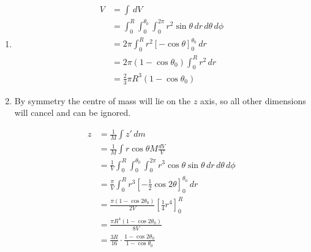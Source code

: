 \documentclass{article}
\begin{document}
\setcounter{subsection}{6}
\subsection{}

\begin{enumerate}
  \item

        \begin{align*}
          V & = \int \,d V                                                                          \\
            & = \int_0^R \int_0^{\theta_0} \int_0^{2 \pi} r^2 \sin \theta \,d r \,d \theta \,d \phi \\
            & = 2 \pi \int_0^R r^2 [-\cos \theta]_0^{\theta_0} \,d r                                \\
            & = 2 \pi (1 - \cos \theta_0) \int_0^R r^2 \,d r                                        \\
            & = \frac{2}{3} \pi R^3 (1 - \cos \theta_0)
        \end{align*}

  \item By symmetry the centre of mass will lie on the $z$ axis, so all other dimensions will cancel and can be ignored.

        \begin{align*}
          z & = \frac{1}{M} \int z' \,d m                                                                                   \\
            & = \frac{1}{M} \int r \cos \theta M \frac{d V}{V}                                                              \\
            & = \frac{1}{V} \int_0^R \int_0^{\theta_0} \int_0^{2 \pi} r^3 \cos \theta \sin \theta \,d r \,d \theta \,d \phi \\
            & = \frac{\pi}{V} \int_0^R r^3 \left[ -\frac{1}{2} \cos 2 \theta \right]_0^{\theta_0} \,d r                     \\
            & = \frac{\pi (1 - \cos 2 \theta_0)}{2 V} \left[ \frac{1}{4} r^4 \right]_0^R                                    \\
            & = \frac{\pi R^4 (1 - \cos 2 \theta_0)}{8 V}                                                                   \\
            & = \frac{3 R}{16} \cdot \frac{1 - \cos 2 \theta_0}{1 - \cos \theta_0}                                          \\
        \end{align*}
\end{enumerate}
\end{document}
